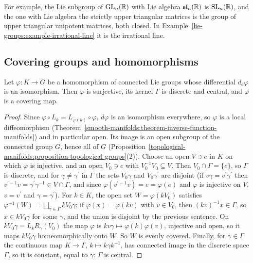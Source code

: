 For example, the Lie subgroup of $\mathrm{GL}_n(\mathbb{R})$ with Lie algebra $\mathfrak{sl}_n(\mathbb{R})$ is $\mathrm{SL}_n(\mathbb{R})$, and the one with Lie algebra the strictly upper triangular
matrices is the group of upper triangular unipotent matrices, both closed. In Example~\ref{lie-groups:example-irrational-line} it is the irrational line.

\subsection{Covering groups and homomorphisms}\label{lie-groups:subsection-covering-groups}

\begin{lemma}\label{lie-groups:lemma-local-isomorphism-covering}
Let $\varphi \colon K \to G$ be a homomorphism of connected Lie groups whose differential $d_e\varphi$ is an isomorphism. Then $\varphi$ is surjective, its kernel $\Gamma$ is
discrete and central, and $\varphi$ is a covering map.
\end{lemma}

\begin{proof}
Since $\varphi \circ L_k = L_{\varphi(k)} \circ \varphi$, $d\varphi$ is an isomorphism everywhere, so $\varphi$ is a local diffeomorphism
(Theorem~\ref{smooth-manifolds:theorem-inverse-function-manifolds}) and in particular open. Its image is an open subgroup of the connected group $G$, hence all
of $G$ (Proposition~\ref{topological-manifolds:proposition-topological-groups}(2)). Choose an open $V \ni e$ in $K$ on which $\varphi$ is injective, and an open
$V_0 \ni e$ with $V_0^{-1}V_0 \subseteq V$. Then $V_0 \cap \Gamma = \{e\}$, so $\Gamma$ is discrete, and for $\gamma \neq \gamma^{\prime}$ in $\Gamma$ the sets $V_0\gamma$ and
$V_0\gamma^{\prime}$ are disjoint (if $v\gamma = v^{\prime}\gamma^{\prime}$ then $v^{\prime-1}v = \gamma^{\prime}\gamma^{-1} \in V \cap \Gamma$, and since $\varphi(v^{\prime-1}v) = e = \varphi(e)$ and $\varphi$ is
injective on $V$, $v = v^{\prime}$ and $\gamma = \gamma^{\prime}$). For $k \in K$, the open set $W = \varphi(kV_0)$ satisfies $\varphi^{-1}(W) = \bigsqcup_{\gamma \in \Gamma}kV_0\gamma$: if
$\varphi(x) = \varphi(kv)$ with $v \in V_0$, then $(kv)^{-1}x \in \Gamma$, so $x \in kV_0\gamma$ for some $\gamma$, and the union is disjoint by the previous sentence. On
$kV_0\gamma = L_kR_\gamma(V_0)$ the map $\varphi$ is $kv\gamma \mapsto \varphi(k)\varphi(v)$, injective and open, so it maps $kV_0\gamma$ homeomorphically onto $W$. So $W$ is evenly
covered. Finally, for
$\gamma \in \Gamma$ the continuous map $K \to \Gamma$, $k \mapsto k\gamma k^{-1}$, has connected image in the discrete space $\Gamma$, so it is constant, equal to $\gamma$:
$\Gamma$ is central.
\end{proof}

